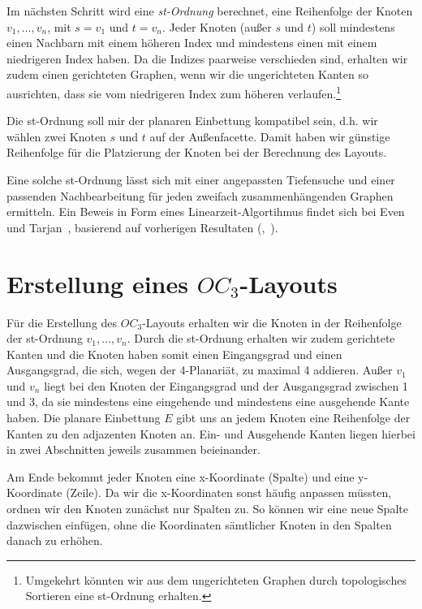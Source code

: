 \documentclass[a4paper]{scrreprt}
\theoremstyle{definition}
\begin{document}
Im nächsten Schritt wird eine \emph{st-Ordnung} berechnet, eine Reihenfolge der Knoten $v_1, \dots, v_n$, mit $s=v_1$ und $t=v_n$. Jeder Knoten (außer $s$ und $t$) soll mindestens einen Nachbarn mit einem höheren Index und mindestens einen mit einem niedrigeren Index haben. Da die Indizes paarweise verschieden sind, erhalten wir zudem einen gerichteten Graphen, wenn wir die ungerichteten Kanten so ausrichten, dass sie vom niedrigeren Index zum höheren verlaufen.\footnote {Umgekehrt könnten wir aus dem ungerichteten Graphen durch topologisches Sortieren eine st-Ordnung erhalten.}

Die st-Ordnung soll mir der planaren Einbettung kompatibel sein, d.h. wir wählen zwei Knoten $s$ und $t$ auf der Außenfacette. Damit haben wir günstige Reihenfolge für die Platzierung der Knoten bei der Berechnung des Layouts. 

Eine solche st-Ordnung lässt sich mit einer angepassten Tiefensuche und einer passenden Nachbearbeitung für jeden zweifach zusammenhängenden Graphen ermitteln. Ein Beweis in Form eines Linearzeit-Algortihmus findet sich bei Even und Tarjan~\cite{even+tarjan-75}, basierend auf vorherigen Resultaten (\cite{hopcroft+tarjan-74},~\cite{tarjan-72}).

\section{Erstellung eines $OC_3$-Layouts}

Für die Erstellung des $OC_3$-Layouts erhalten wir die Knoten in der Reihenfolge der st-Ordnung $v_1, \dots, v_n$. Durch die st-Ordnung erhalten wir zudem gerichtete Kanten und die Knoten haben somit einen Eingangsgrad und einen Ausgangsgrad, die sich, wegen der 4-Planariät, zu maximal 4 addieren. Außer $v_1$ und $v_n$ liegt bei den Knoten der Eingangsgrad und der Ausgangsgrad zwischen 1 und 3, da sie mindestens eine eingehende und mindestens eine ausgehende Kante haben. Die planare Einbettung $E$ gibt uns an jedem Knoten eine Reihenfolge der Kanten zu den adjazenten Knoten an. Ein- und Ausgehende Kanten liegen hierbei in zwei Abschnitten jeweils zusammen beieinander.

Am Ende bekommt jeder Knoten eine x-Koordinate (Spalte) und eine y-Koordinate (Zeile). Da wir die x-Koordinaten sonst häufig anpassen müssten, ordnen wir den Knoten zunächst nur Spalten zu. So können wir eine neue Spalte dazwischen einfügen, ohne die Koordinaten sämtlicher Knoten in den Spalten danach zu erhöhen. 
\end{document}
